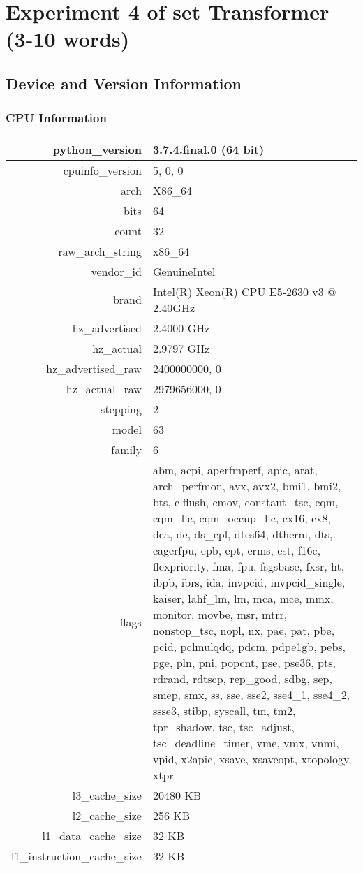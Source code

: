 \documentclass{article}%
\begin{document}
%
\normalsize%
\section{Experiment 4 of set Transformer (3{-}10 words)}%
\label{sec:Experiment 4 of set Transformer (3{-}10 words)}%
\subsection{Device and Version Information}%
\label{subsec:Device and Version Information}%
\subsubsection{CPU Information}%
\label{ssubsec:CPU Information}%
\begin{tabular}{|r|p{8cm}|}%
\hline%
python\_version&3.7.4.final.0 (64 bit)\\%
\hline%
cpuinfo\_version&5, 0, 0\\%
\hline%
arch&X86\_64\\%
\hline%
bits&64\\%
\hline%
count&32\\%
\hline%
raw\_arch\_string&x86\_64\\%
\hline%
vendor\_id&GenuineIntel\\%
\hline%
brand&Intel(R) Xeon(R) CPU E5{-}2630 v3 @ 2.40GHz\\%
\hline%
hz\_advertised&2.4000 GHz\\%
\hline%
hz\_actual&2.9797 GHz\\%
\hline%
hz\_advertised\_raw&2400000000, 0\\%
\hline%
hz\_actual\_raw&2979656000, 0\\%
\hline%
stepping&2\\%
\hline%
model&63\\%
\hline%
family&6\\%
\hline%
flags&abm, acpi, aperfmperf, apic, arat, arch\_perfmon, avx, avx2, bmi1, bmi2, bts, clflush, cmov, constant\_tsc, cqm, cqm\_llc, cqm\_occup\_llc, cx16, cx8, dca, de, ds\_cpl, dtes64, dtherm, dts, eagerfpu, epb, ept, erms, est, f16c, flexpriority, fma, fpu, fsgsbase, fxsr, ht, ibpb, ibrs, ida, invpcid, invpcid\_single, kaiser, lahf\_lm, lm, mca, mce, mmx, monitor, movbe, msr, mtrr, nonstop\_tsc, nopl, nx, pae, pat, pbe, pcid, pclmulqdq, pdcm, pdpe1gb, pebs, pge, pln, pni, popcnt, pse, pse36, pts, rdrand, rdtscp, rep\_good, sdbg, sep, smep, smx, ss, sse, sse2, sse4\_1, sse4\_2, ssse3, stibp, syscall, tm, tm2, tpr\_shadow, tsc, tsc\_adjust, tsc\_deadline\_timer, vme, vmx, vnmi, vpid, x2apic, xsave, xsaveopt, xtopology, xtpr\\%
\hline%
l3\_cache\_size&20480 KB\\%
\hline%
l2\_cache\_size&256 KB\\%
\hline%
l1\_data\_cache\_size&32 KB\\%
\hline%
l1\_instruction\_cache\_size&32 KB\\%
\hline%
\end{tabular}
\end{document}
